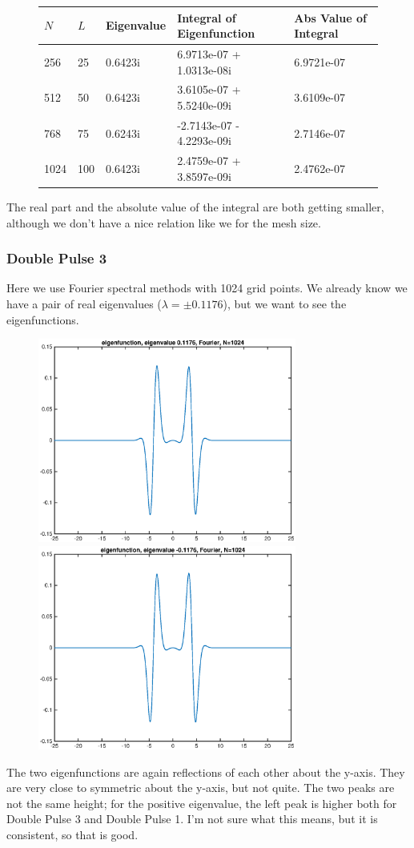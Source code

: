 \documentclass[12pt]{article}
\begin{document}
\begin{figure}[H]
\begin{tabular}{l|llll}  
  $N$  & $L$    &  Eigenvalue &  Integral of Eigenfunction  & Abs Value of Integral   \\ \hline
  256  &  25    &   0.6423i   &  6.9713e-07 + 1.0313e-08i & 6.9721e-07 \\ 
  512  &  50    &   0.6423i   &  3.6105e-07 + 5.5240e-09i & 3.6109e-07 \\ 
  768  &  75    &   0.6243i   & -2.7143e-07 - 4.2293e-09i & 2.7146e-07 \\
  1024 &  100   &   0.6423i   &  2.4759e-07 + 3.8597e-09i & 2.4762e-07 \\
\end{tabular}
\end{figure}
The real part and the absolute value of the integral are both getting smaller, although we don't have a nice relation like we for the mesh size.

\subsubsection*{Double Pulse 3}
Here we use Fourier spectral methods with 1024 grid points. We already know we have a pair of real eigenvalues ($\lambda = \pm 0.1176$), but we want to see the eigenfunctions.

\begin{figure}[H]
\includegraphics[width=8.5cm]{1double3fouriereigenfnplus}
\includegraphics[width=8.5cm]{1double3fouriereigenfnminus}
\end{figure}
The two eigenfunctions are again reflections of each other about the y-axis. They are very close to symmetric about the y-axis, but not quite. The two peaks are not the same height; for the positive eigenvalue, the left peak is higher both for Double Pulse 3 and Double Pulse 1. I'm not sure what this means, but it is consistent, so that is good.
\end{document}
